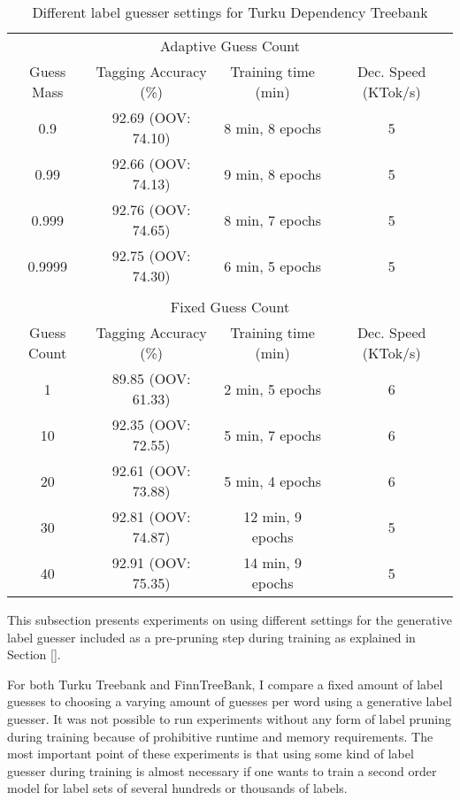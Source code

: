 \begin{table}[htb!]
\begin{center}
\begin{tabular}{cccc}
\multicolumn{4}{c}{Adaptive Guess Count}\\
Guess Mass & Tagging Accuracy (\%) & Training time (min) & Dec. Speed (KTok/s)\\
\hline
0.9        & 92.69 (OOV: 74.10)           & 8 min, 8 epochs           & 5            \\
0.99       & 92.66 (OOV: 74.13)           & 9 min, 8 epochs           & 5            \\
0.999      & 92.76 (OOV: 74.65)           & 8 min, 7 epochs            & 5            \\
0.9999      & 92.75 (OOV: 74.30)           & 6 min, 5 epochs            & 5            \\
           &                  &               &               \\
\multicolumn{4}{c}{Fixed Guess Count}\\
Guess Count & Tagging Accuracy (\%) & Training time (min) & Dec. Speed (KTok/s) \\
\hline
1        & 89.85  (OOV: 61.33)          & 2 min, 5 epochs            & 6            \\
10       & 92.35  (OOV: 72.55)          & 5 min, 7 epochs            & 6            \\
20       & 92.61  (OOV: 73.88)          & 5 min, 4 epochs            & 6            \\
30       & 92.81  (OOV: 74.87)          & 12 min, 9 epochs          & 5            \\
40       & 92.91  (OOV: 75.35)          & 14 min, 9 epochs            & 5            \\
\end{tabular}
\caption{Different label guesser settings for Turku Dependency Treebank}
\end{center}
\end{table}

This subsection presents experiments on using different settings for
the generative label guesser included as a pre-pruning step during
training as explained in Section \ref{}.

For both Turku Treebank and FinnTreeBank, I compare a fixed amount of
label guesses to choosing a varying amount of guesses per word using a
generative label guesser. It was not possible to run experiments
without any form of label pruning during training because of
prohibitive runtime and memory requirements. The most important point
of these experiments is that using some kind of label guesser during
training is almost necessary if one wants to train a second order
model for label sets of several hundreds or thousands of labels.


